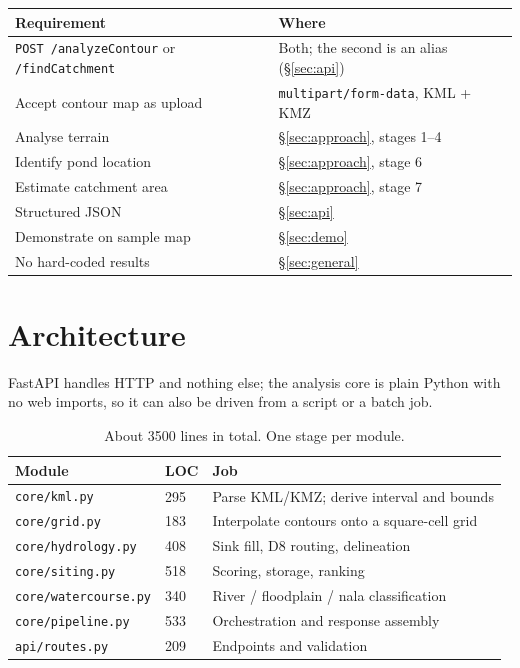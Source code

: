 \documentclass[11pt,a4paper]{article}
\begin{document}
\begin{table}[H]
\centering\small
\begin{tabular}{@{}p{}p{}@{}}
\toprule
\textbf{Requirement} & \textbf{Where} \\
\midrule
\texttt{POST /analyzeContour} or \texttt{/findCatchment} & Both; the second is an alias (\S\ref{sec:api}) \\
Accept contour map as upload & \texttt{multipart/form-data}, KML + KMZ \\
Analyse terrain & \S\ref{sec:approach}, stages 1--4 \\
Identify pond location & \S\ref{sec:approach}, stage 6 \\
Estimate catchment area & \S\ref{sec:approach}, stage 7 \\
Structured JSON & \S\ref{sec:api} \\
Demonstrate on sample map & \S\ref{sec:demo} \\
No hard-coded results & \S\ref{sec:general} \\
\bottomrule
\end{tabular}
\end{table}

\section{Architecture}

FastAPI handles HTTP and nothing else; the analysis core is plain Python with no
web imports, so it can also be driven from a script or a batch job.

\begin{table}[H]
\centering\small
\begin{tabular}{@{}llp{}@{}}
\toprule
\textbf{Module} & \textbf{LOC} & \textbf{Job} \\
\midrule
\texttt{core/kml.py}         & 295 & Parse KML/KMZ; derive interval and bounds \\
\texttt{core/grid.py}        & 183 & Interpolate contours onto a square-cell grid \\
\texttt{core/hydrology.py}   & 408 & Sink fill, D8 routing, delineation \\
\texttt{core/siting.py}      & 518 & Scoring, storage, ranking \\
\texttt{core/watercourse.py} & 340 & River / floodplain / nala classification \\
\texttt{core/pipeline.py}    & 533 & Orchestration and response assembly \\
\texttt{api/routes.py}       & 209 & Endpoints and validation \\
\bottomrule
\end{tabular}
\caption{About 3500 lines in total. One stage per module.}
\end{table}
\end{document}
